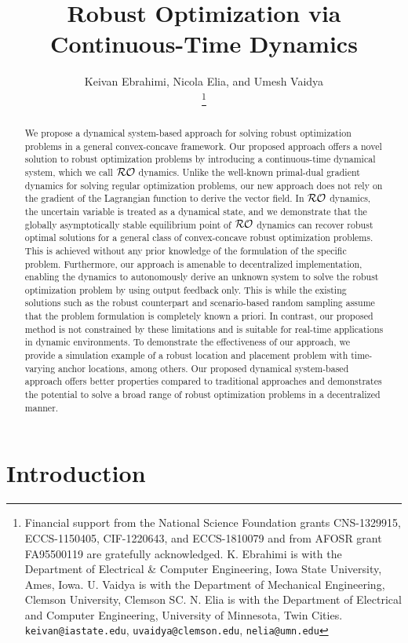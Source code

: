\documentclass[journal,twoside,web]{ieeecolor}
\title{\LARGE \bf Robust Optimization via Continuous-Time Dynamics}
\author{Keivan Ebrahimi, Nicola Elia, and Umesh Vaidya\\
\thanks{Financial support from the National Science Foundation grants CNS-1329915, ECCS-1150405, CIF-1220643, and ECCS-1810079 and from AFOSR grant FA95500119 are gratefully acknowledged. K. Ebrahimi is with the Department of Electrical \& Computer Engineering, Iowa State University, Ames, Iowa. U. Vaidya is with the Department of Mechanical Engineering, Clemson University, Clemson SC.  N. Elia is with the Department of Electrical and Computer Engineering, University of Minnesota, Twin Cities.
{\tt\small keivan@iastate.edu},
{\tt\small uvaidya@clemson.edu},
{\tt\small nelia@umn.edu}
}}
\begin{document}
\pagestyle{headings}
\setcounter{page}{1}

\maketitle

\begin{abstract}
We propose a dynamical system-based approach for solving robust optimization problems in a general convex-concave framework. Our proposed approach offers a novel solution to robust optimization problems by introducing a continuous-time dynamical system, which we call ${\cal RO}$ dynamics. Unlike the well-known primal-dual gradient dynamics for solving regular optimization problems, our new approach does not rely on the gradient of the Lagrangian function to derive the vector field. In ${\cal RO}$ dynamics, the uncertain variable is treated as a dynamical state, and we demonstrate that the globally asymptotically stable equilibrium point of ${\cal RO}$ dynamics can recover robust optimal solutions for a general class of convex-concave robust optimization problems. This is achieved without any prior knowledge of the formulation of the specific problem. Furthermore, our approach is amenable to decentralized implementation, enabling the dynamics to autonomously derive an unknown system to solve the robust optimization problem by using output feedback only. This is while the existing solutions such as the robust counterpart and scenario-based random sampling assume that the problem formulation is completely known a priori. In contrast, our proposed method is not constrained by these limitations and is suitable for real-time applications in dynamic environments. To demonstrate the effectiveness of our approach, we provide a simulation example of a robust location and placement problem with time-varying anchor locations, among others. Our proposed dynamical system-based approach offers better properties compared to traditional approaches and demonstrates the potential to solve a broad range of robust optimization problems in a decentralized manner.
\end{abstract}

\section{Introduction}
\end{document}
